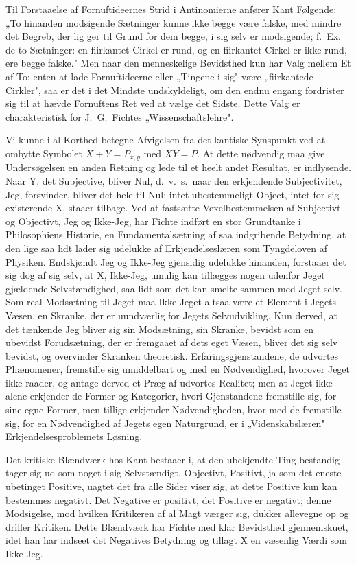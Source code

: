 \documentclass[12pt]{article}
\newcommand{\opage}[1]{\marginnote{\footnotesize\textit{[#1]}}}
\begin{document}
Til Forstaaelse af Fornuftideernes Strid i Antinomierne
anfører Kant Følgende: „To hinanden modsigende Sætninger
kunne ikke begge være falske, med mindre det Begreb, der lig%
\opage{20}ger til Grund for dem begge, i sig selv er modsigende; f.\ Ex.
de to Sætninger: en fiirkantet Cirkel er rund, og en fiirkantet
Cirkel er ikke rund, ere begge falske." Men naar den
menneskelige Bevidsthed kun har Valg mellem Et af To: enten at
lade Fornuftideerne eller „Tingene i sig" være „fiirkantede
Cirkler", saa er det i det Mindste undskyldeligt, om den endnu
engang fordrister sig til at hævde Fornuftens Ret ved at vælge det
Sidste. Dette Valg er charakteristisk for J.\ G.\ Fichtes
„Wissenschaftslehre".

Vi kunne i al Korthed betegne Afvigelsen fra det kantiske
Synspunkt ved at ombytte Symbolet $X + Y = P_{x,y}$ med
$XY = P$. At dette nødvendig maa give Undersøgelsen en anden
Retning og lede til et heelt andet Resultat, er indlysende.
Naar Y, det Subjective, bliver Nul, d.\ v.\ s.\ naar den
erkjendende Subjectivitet, Jeg, forsvinder, bliver det hele til Nul:
intet ubestemmeligt Object, intet for sig existerende X, staaer
tilbage. Ved at fastsætte Vexelbestemmelsen af Subjectivt og
Objectivt, Jeg og Ikke-Jeg, har Fichte indført en stor
Grundtanke i Philosophiens Historie, en Fundamentalsætning af saa
indgribende Betydning, at den lige saa lidt lader sig udelukke
af Erkjendelseslæren som Tyngdeloven af Physiken. Endskjøndt
Jeg og Ikke-Jeg gjensidig udelukke hinanden, forstaaer det
sig dog af sig selv, at X, Ikke-Jeg, umulig kan tillægges nogen
udenfor Jeget gjældende Selvstændighed, saa lidt som det kan
smelte sammen med Jeget selv. Som real Modsætning til Jeget
maa Ikke-Jeget altsaa være et Element i Jegets Væsen, en
Skranke, der er uundværlig for Jegets Selvudvikling. Kun
derved, at det tænkende Jeg bliver sig sin Modsætning, sin
Skranke, bevidst som en ubevidst Forudsætning, der er
fremgaaet af dets eget Væsen, bliver det sig selv bevidst, og
overvinder Skranken theoretisk. Erfaringsgjenstandene, de udvortes
Phænomener, fremstille sig umiddelbart og med en Nødvendighed,
hvorover Jeget ikke raader, og antage derved et Præg
af udvortes Realitet; men at Jeget ikke alene erkjender de
Former og Kategorier, hvori Gjenstandene fremstille sig, for
sine egne Former, men tillige erkjender Nødvendigheden, hvor%
\opage{21}med de fremstille sig, for en Nødvendighed af Jegets egen
Naturgrund, er i „Videnskabslæren" Erkjendelsesproblemets Løsning.

Det kritiske Blændværk hos Kant bestaaer i, at den
ubekjendte Ting bestandig tager sig ud som noget i sig Selvstændigt,
Objectivt, Positivt, ja som det eneste ubetinget Positive,
uagtet det fra alle Sider viser sig, at dette Positive kun kan
bestemmes negativt. Det Negative er positivt, det Positive er
negativt; denne Modsigelse, mod hvilken Kritikeren af al Magt
værger sig, dukker allevegne op og driller Kritiken. Dette
Blændværk har Fichte med klar Bevidsthed gjennemskuet, idet
han har indseet det Negatives Betydning og tillagt X en
væsenlig Værdi som Ikke-Jeg.
\end{document}
